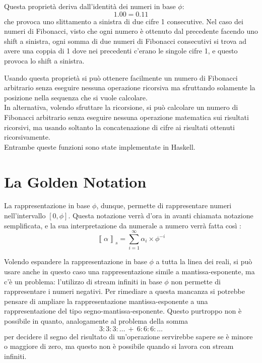 \documentclass[Lau,oneside]{sapthesis}
\begin{document}
\medskip

Questa proprietà deriva dall'identità dei numeri in base $\phi$:
$$1.00 = 0.11$$
che provoca uno slittamento a sinistra di due cifre 1 consecutive. Nel caso dei numeri di Fibonacci, visto che ogni numero è ottenuto dal precedente facendo uno shift a sinistra, ogni somma di due numeri di Fibonacci consecutivi si trova ad avere una coppia di 1 dove nei precedenti c'erano le singole cifre 1, e questo provoca lo shift a sinistra.

\medskip

Usando questa proprietà si può ottenere facilmente un numero di Fibonacci arbitrario senza eseguire nessuna operazione ricorsiva ma sfruttando solamente la posizione nella sequenza che si vuole calcolare.\\
In alternativa, volendo sfruttare la ricorsione, si può calcolare un numero di Fibonacci arbitrario senza eseguire nessuna operazione matematica sui risultati ricorsivi, ma usando soltanto la concatenazione di cifre ai risultati ottenuti ricorsivamente.\\
Entrambe queste funzioni sono state implementate in Haskell. 



\chapter{La Golden Notation}
La rappresentazione in base $\phi$, dunque, permette di rappresentare numeri nell'intervallo $\left[0,\phi\right]$. Questa notazione verrà d'ora in avanti chiamata notazione semplificata, e la sua interpretazione da numerale a numero verrà fatta così \cite{PietroDiGianantonio}:
$$\left\llbracket \alpha \right\rrbracket_s = \sum_{i=1}^{\infty} \alpha_i \times \phi^{-i}$$

Volendo espandere la rappresentazione in base $\phi$ a tutta la linea dei reali, si può usare anche in questo caso una rappresentazione simile a mantissa-esponente, ma c'è un problema: l'utilizzo di stream infiniti in base $\phi$ non permette di rappresentare i numeri negativi. Per rimediare a questa mancanza si potrebbe pensare di ampliare la rappresentazione mantissa-esponente a una rappresentazione del tipo segno-mantissa-esponente. Questo purtroppo non è possibile in quanto, analogamente al problema della somma
$$3:3:3:\ldots \ + \ 6:6:6:\ldots$$
per decidere il segno del risultato di un'operazione servirebbe sapere se è minore o maggiore di zero, ma questo non è possibile quando si lavora con stream infiniti.
\end{document}
